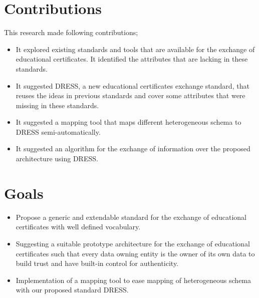 \documentclass[12pt,a4paper,oneside]{book}
\begin{document}
\section{Contributions}\label{s-contributions}
This research made following contributions;

\begin{itemize}
\item
It explored existing standards and tools that are available for the exchange of educational certificates. It identified the attributes that are lacking in these standards. 
\item
It suggested DRESS, a new educational certificates exchange standard, that reuses the ideas in previous standards and cover some attributes that were missing in these standards.
\item
It suggested a mapping tool that maps different heterogeneous schema to DRESS semi-automatically.
\item
It suggested an algorithm for the exchange of information over the proposed architecture using DRESS.

\end{itemize}





\section{Goals}\label{s-goals}

\begin{itemize}
\item
Propose a generic and extendable standard for the exchange of educational certificates with well defined vocabulary.
\item
Suggesting a suitable prototype architecture for the exchange of educational certificates such that 
every data owning entity is the owner of its own data to build trust and have built-in control for authenticity.
\item
Implementation of a mapping tool to ease mapping of heterogeneous schema with our proposed standard DRESS.
\end{itemize}
\end{document}
